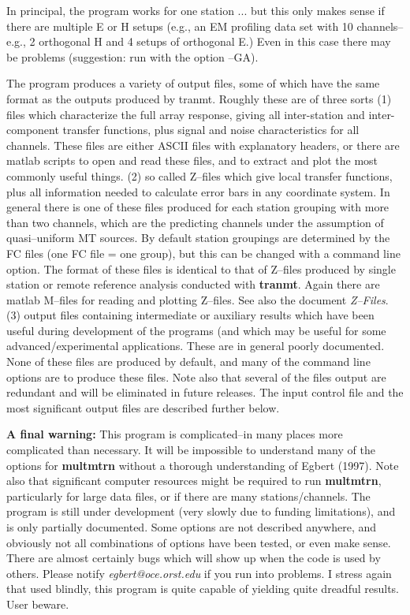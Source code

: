 In principal, the program works for one station ... but this only makes
sense if there are multiple E or H setups (e.g., an EM profiling data set
with 10 channels--e.g., 2 orthogonal H and 4 setups of orthogonal E.)  Even in this
case there may be problems (suggestion: run with the option --GA).

The program
produces a variety of output files, some of which have the same format
as the outputs produced by tranmt.  Roughly these are of three sorts
\noindent
(1) files which characterize the full array response,
giving all inter-station and inter-component transfer functions,
plus signal and noise characteristics for all channels.  These files
are either ASCII files with explanatory headers, or there are matlab
scripts to open and read these files, and to extract and plot the most
commonly useful things.
\noindent
(2) so called Z--files which give local transfer functions,
plus all information needed to calculate error bars in any
coordinate system.  In general there is one of these files
produced for each station grouping with more than two channels,
which are the predicting channels under the assumption of quasi--uniform
MT sources.  By default station groupings are determined
by the FC files (one FC file = one group), but this can
be changed with a command line option.
The format of these files is identical to that of Z--files produced by
single station or remote reference analysis conducted with {\bf tranmt}.
Again there are matlab M--files for reading and plotting Z--files.
See also the document {\it Z--Files}.
\noindent
(3) output files containing intermediate or auxiliary results which have been
useful during development of the programs (and which may be useful for
some advanced/experimental applications.  These are in general poorly documented.
None of these files are produced by default, and many of the command line
options are to produce these files.
\noindent
Note also that several of the files output are redundant and will be eliminated
in future releases.   
The input control file and the most significant output
files are described further below.

{\bf A final warning:}  This program is complicated--in many places more 
complicated than necessary.  It will be impossible to understand
many of the options for {\bf multmtrn} without a thorough understanding of
Egbert (1997).  Note also that significant computer resources might be required
to run {\bf multmtrn}, particularly for large data files, or if there
are many stations/channels.  
The program is still under development 
(very slowly due to funding limitations),
and is only partially documented.  Some
options are not described anywhere, and obviously not all combinations of
options have been tested, or even make sense.
There are almost certainly bugs which will show up when
the code is used by others.  Please notify {\it egbert@oce.orst.edu}
if you run into problems.   I stress again that used
blindly, this program is quite capable of yielding quite dreadful results.
User beware.

